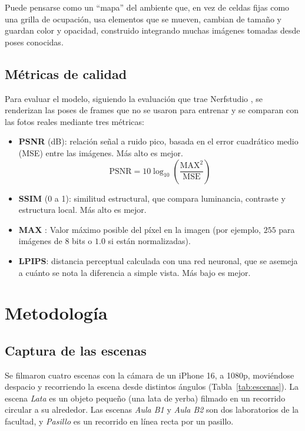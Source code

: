 \documentclass[conference,a4paper]{IEEEtran}
\begin{document}
Puede pensarse como un ``mapa'' del ambiente que, en vez de celdas fijas como una grilla de ocupación, usa elementos que se mueven, cambian de tamaño y guardan color y opacidad, construido integrando muchas imágenes tomadas desde poses conocidas.

\subsection{Métricas de calidad}

Para evaluar el modelo, siguiendo la evaluación que trae Nerfstudio \cite{nerfstudio}, se renderizan las poses de frames que no se usaron para entrenar y se comparan con las fotos reales mediante tres métricas:
\begin{itemize}
\item \textbf{PSNR} (dB): relación señal a ruido pico, basada en el error cuadrático medio (MSE) entre las imágenes. Más alto es mejor.
\begin{equation}
\mathrm{PSNR} = 10\log_{10}\!\left(\frac{\mathrm{MAX}^2}{\mathrm{MSE}}\right)
\end{equation}
\item \textbf{SSIM} (0 a 1): similitud estructural, que compara luminancia, contraste y estructura local. Más alto es mejor.
\item \textbf{MAX} : Valor máximo posible del píxel en la imagen (por ejemplo, $255$ para imágenes de 8 bits o $1.0$ si están normalizadas).
\item \textbf{LPIPS}: distancia perceptual calculada con una red neuronal, que se asemeja a cuánto se nota la diferencia a simple vista. Más bajo es mejor.
\end{itemize}

\section{Metodología}

\subsection{Captura de las escenas}

Se filmaron cuatro escenas con la cámara de un iPhone 16, a 1080p, moviéndose despacio y recorriendo la escena desde distintos ángulos (Tabla~\ref{tab:escenas}). La escena \textit{Lata} es un objeto pequeño (una lata de yerba) filmado en un recorrido circular a su alrededor. Las escenas \textit{Aula B1} y \textit{Aula B2} son dos laboratorios de la facultad, y \textit{Pasillo} es un recorrido en línea recta por un pasillo.
\end{document}
